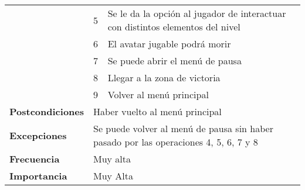 \begin{longtable}{lll}
\multicolumn{1}{l|}{}                            & 5                                     & Se le da la opción al jugador de interactuar con distintos elementos del nivel                         \\
\multicolumn{1}{l|}{}                            & 6                                     & El avatar jugable podrá morir                                                                          \\
\multicolumn{1}{l|}{}                            & 7                                     & Se puede abrir el menú de pausa                                                                        \\
\multicolumn{1}{l|}{}                            & 8                                     & Llegar a la zona de victoria                                                                           \\
\multicolumn{1}{l|}{}                            & 9                                     & Volver al menú principal                                                                               \\ \hline
\textbf{Postcondiciones}                         & \multicolumn{2}{l}{Haber vuelto al menú principal}                                                                                             \\ \hline
\textbf{Excepciones}                             & \multicolumn{2}{l}{Se puede volver al menú de pausa sin haber pasado por las operaciones 4, 5, 6, 7 y 8}                                       \\ \hline
\textbf{Frecuencia}                              & \multicolumn{2}{l}{Muy alta}                                                                                                                   \\ \hline
\textbf{Importancia}                             & \multicolumn{2}{l}{Muy Alta}                                                                                                                   \\ \hline
\end{longtable}

